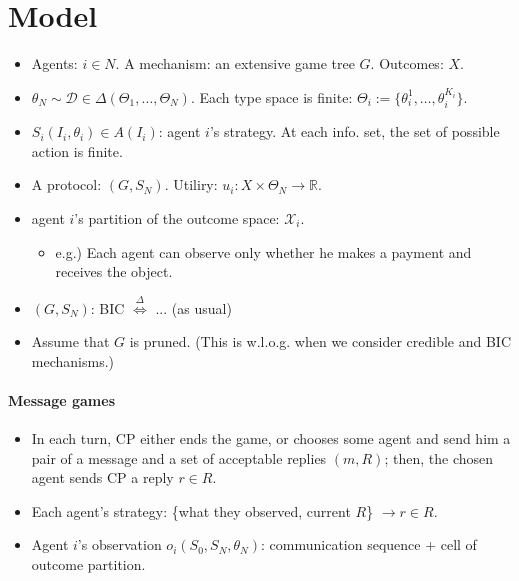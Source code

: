 \documentclass[11pt,a4paper,dvipdfmx]{article}
\theoremstyle{plain}
\newcommand{\R}{\mathbb{R}}
\newcommand{\mD}{\mathcal{D}}
\newcommand{\mX}{\mathcal{X}}
\newcommand{\defi}{\stackrel{\Delta}{\Longleftrightarrow}}
\newcommand{\1}{\mathbbm{1}}
\begin{document}
\section{Model}
\begin{itemize}
	\item Agents: $i \in N$. A mechanism: an extensive game tree $G$. Outcomes: $X$.
	\item $\theta_N \sim \mD \in \Delta(\Theta_1, \dots, \Theta_N)$. Each type space is finite: $\Theta_i := \{\theta_i^1, \dots, \theta_i^{K_i}\}$.
	\item $S_i(I_i, \theta_i) \in A(I_i)$: agent $i$'s strategy. At each info. set, the set of possible action is finite.
	\item A protocol: $(G, S_N)$. Utiliry: $u_i: X \times \Theta_N \to \R$.
	\item agent $i$'s partition of the outcome space: $\mX_i$.
	\begin{itemize}
		\item e.g.) Each agent can observe only whether he makes a payment and receives the object.
	\end{itemize}
	\item $(G, S_N)$: BIC $\defi$ ... (as usual)
	\item Assume that $G$ is pruned. (This is w.l.o.g. when we consider credible and BIC mechanisms.)
\end{itemize}


\paragraph{Message games}
\begin{itemize}
	\item In each turn, CP either ends the game, or chooses some agent and send him a pair of a message and a set of acceptable replies $(m, R)$; then, the chosen agent sends CP a reply $r \in R$.
	\item Each agent's strategy: \{what they observed, current $R$\} $\to r \in R$.
	\item Agent $i$'s observation $o_i(S_0,S_N,\theta_N)$: communication sequence + cell of outcome partition.
\end{itemize}
\end{document}
